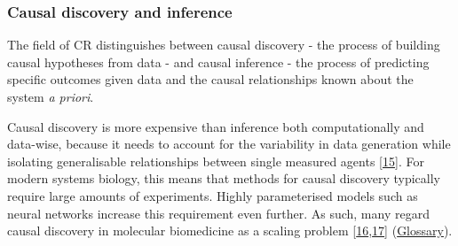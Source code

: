 \hypertarget{causal-discovery-and-inference}{%
\subsubsection{Causal discovery and inference}\label{causal-discovery-and-inference}}

The field of CR distinguishes between causal discovery - the process of building causal hypotheses from data - and causal inference - the process of predicting specific outcomes given data and the causal relationships known about the system \emph{a priori}.

Causal discovery is more expensive than inference both computationally and data-wise, because it needs to account for the variability in data generation while isolating generalisable relationships between single measured agents {[}\protect\hyperlink{ref-1CPlHia5R}{15}{]}.
For modern systems biology, this means that methods for causal discovery typically require large amounts of experiments. Highly parameterised models such as neural networks increase this requirement even further. As such, many regard causal discovery in molecular biomedicine as a scaling problem {[}\protect\hyperlink{ref-10mjWN2op}{16},\protect\hyperlink{ref-10AL1hWhU}{17}{]} (\protect\hyperlink{scaling-hypothesis}{Glossary}).

